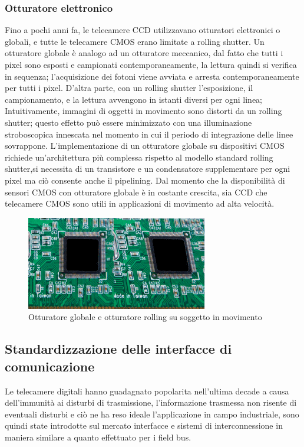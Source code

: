 \subsubsection{Otturatore elettronico}
Fino a pochi anni fa, le telecamere CCD utilizzavano otturatori elettronici o globali, e tutte le telecamere CMOS erano limitate a rolling shutter. Un otturatore globale è analogo ad un otturatore meccanico, dal fatto che tutti i pixel sono esposti e campionati contemporaneamente, la lettura quindi si verifica in sequenza; l'acquisizione dei fotoni viene avviata e arresta contemporaneamente per tutti i pixel. D'altra parte, con un rolling shutter l'esposizione, il campionamento, e la lettura avvengono  in istanti diversi per ogni linea; Intuitivamente, immagini di oggetti in movimento sono distorti da un rolling shutter; questo effetto può essere minimizzato con una illuminazione stroboscopica innescata nel momento in cui il periodo di integrazione delle linee sovrappone. L'implementazione di un otturatore globale su dispositivi CMOS richiede un'architettura più complessa rispetto al modello standard rolling shutter,si necessita di un transistore e un condensatore supplementare per ogni pixel ma ciò consente anche il pipelining.
Dal momento che la disponibilità di sensori CMOS con otturatore globale è in costante crescita, sia CCD che telecamere CMOS sono utili in applicazioni di movimento ad alta velocità.

\begin{figure}[!ht]
\centering
\includegraphics[width=.4\textwidth]{img/global-rolling.png}
\caption{Otturatore globale e otturatore rolling su soggetto in movimento}
\label{fig:global-rolling}
\end{figure}

\subsection{Standardizzazione delle interfacce di comunicazione}
Le telecamere digitali hanno guadagnato popolarita nell’ultima decade a causa dell’immunità ai disturbi di
trasmissione, l’informazione trasmessa non risente di eventuali disturbi e ciò ne ha reso ideale
l’applicazione in campo industriale, sono quindi state introdotte sul mercato interfacce e sistemi di
interconnessione in maniera similare a quanto effettuato per i field bus.

